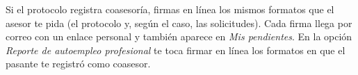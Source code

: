 \documentclass[11pt,a4paper]{article}
\begin{document}
{\small\tableofcontents}
\newpage
\begin{quevasahacer}
Si el protocolo registra coasesoría, firmas en línea los mismos formatos que el asesor te pida (el protocolo y, según el caso, las solicitudes). Cada firma llega por correo con un enlace personal y también aparece en \emph{Mis pendientes}. En la opción \emph{Reporte de autoempleo profesional} te toca firmar en línea los formatos en que el pasante te registró como coasesor.
\end{quevasahacer}



\end{document}
